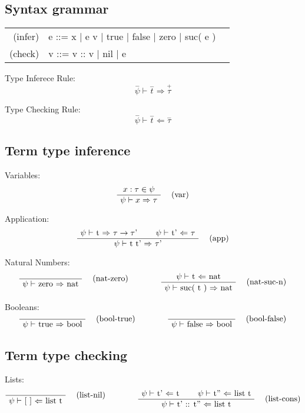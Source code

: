 \documentclass[twoside,a4paper]{article}
\theoremstyle{definition}
\begin{document}
\subsection{Syntax grammar}
\begin{center}
\begin{tabular}{rll}
(infer)& e ::= x
| e v | true | false | zero | suc( e )
\\
(check)& v ::= v :: v  | nil | e
\end{tabular}
\end{center}

Type Inferece Rule:
\[\overset{-}\psi \vdash \overset{-}{t} \Rightarrow \overset{+}\tau\]

Type Checking Rule:
\[\overset{-}\psi \vdash \overset{-}{t} \Leftarrow \overset{-}\tau\]

\subsection{Term type inference}
Variables:
\[
\AxiomC{$x : \tau \in \psi$}
\RightLabel{\quad (var)}
\UnaryInfC{$\psi \vdash x \Rightarrow \tau$}
\DisplayProof
\]

Application:
\[
\AxiomC{$\psi \vdash$ t $\Rightarrow$ $\tau \rightarrow \tau$'}
\AxiomC{$\psi \vdash$ t' $\Leftarrow$ $\tau$}
\RightLabel{\quad (app)}
\BinaryInfC{$\psi \vdash$ t t' $\Rightarrow$ $\tau$'}
\DisplayProof
\]

Natural Numbers:
\[
\AxiomC{}
\RightLabel{\quad (nat-zero)}
\UnaryInfC{$\psi \vdash$ zero $\Rightarrow$ nat}
\DisplayProof
\qquad
\qquad
\AxiomC{$\psi \vdash$ t $\Leftarrow$ nat}
\RightLabel{\quad (nat-suc-n)}
\UnaryInfC{$\psi \vdash$ suc( t ) $\Rightarrow$ nat}
\DisplayProof
\]

Booleans:
\[
\AxiomC{}
\RightLabel{\quad (bool-true)}
\UnaryInfC{$\psi \vdash$ true $\Rightarrow$ bool}
\DisplayProof
\qquad
\qquad
\AxiomC{}
\RightLabel{\quad (bool-false)}
\UnaryInfC{$\psi \vdash$ false $\Rightarrow$ bool}
\DisplayProof
\]

\subsection{Term type checking}
Lists:
\[
\AxiomC{}
\RightLabel{\quad (list-nil)}
\UnaryInfC{$\psi \vdash$ [ ] $\Leftarrow$ list t}
\DisplayProof
\qquad
\qquad
\AxiomC{$\psi \vdash$ t' $\Leftarrow$ t}
\AxiomC{$\psi \vdash$ t'' $\Leftarrow$ list t}
\RightLabel{\quad (list-cons)}
\BinaryInfC{$\psi \vdash$ t' :: t'' $\Leftarrow$ list t}
\DisplayProof
\]
\end{document}

